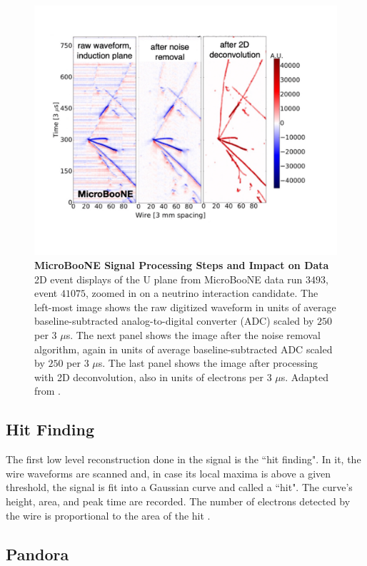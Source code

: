 \begin{figure}[h!]
    \centering
    \includegraphics[width=120mm]{Figures/noise_deconv.jpeg}
    \caption[MicroBooNE Signal Processing Steps and Impact on Data]{{\textbf{MicroBooNE Signal Processing Steps and Impact on Data}}\\ 2D event displays of the U plane from MicroBooNE data run $3493$, event $41075$, zoomed in on a neutrino interaction candidate. The left-most image shows the raw digitized waveform in units of average baseline-subtracted analog-to-digital converter (ADC) scaled by $250$ per $3$ $\mu$s. The next panel shows the image after the noise removal algorithm, again in units of average baseline-subtracted ADC scaled by $250$ per $3$ $\mu$s. The last panel shows the image after processing with 2D deconvolution, also in units of electrons per $3$ $\mu$s. Adapted from \cite{Lauren_thesis}.}
    \label{noise_deconv}
\end{figure}

\subsection{Hit Finding}

The first low level reconstruction done in the signal is the ``hit finding". In it, the wire waveforms are scanned and, in case its local maxima is above a given threshold, the signal is fit into a Gaussian curve and called a ``hit". The curve's height, area, and peak time are recorded. The number of electrons detected by the wire is proportional to the area of the hit \cite{avinay_thesis}.

\subsection{Pandora}

